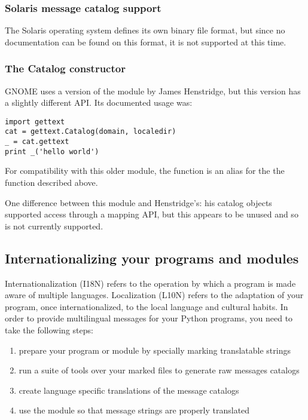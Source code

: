 \subsubsection{Solaris message catalog support}

The Solaris operating system defines its own binary
 file format, but since no documentation can be found on
this format, it is not supported at this time.

\subsubsection{The Catalog constructor}

GNOME uses a version of the  module by
James Henstridge, but this version has a slightly different API.  Its
documented usage was:

\begin{verbatim}
import gettext
cat = gettext.Catalog(domain, localedir)
_ = cat.gettext
print _('hello world')
\end{verbatim}

For compatibility with this older module, the function
 is an alias for the the 
function described above.

One difference between this module and Henstridge's: his catalog
objects supported access through a mapping API, but this appears to be
unused and so is not currently supported.

\subsection{Internationalizing your programs and modules}
Internationalization (I18N) refers to the operation by which a program
is made aware of multiple languages.  Localization (L10N) refers to
the adaptation of your program, once internationalized, to the local
language and cultural habits.  In order to provide multilingual
messages for your Python programs, you need to take the following
steps:

\begin{enumerate}
    \item prepare your program or module by specially marking
          translatable strings
    \item run a suite of tools over your marked files to generate raw
          messages catalogs
    \item create language specific translations of the message catalogs
    \item use the  module so that message strings are
          properly translated
\end{enumerate}

